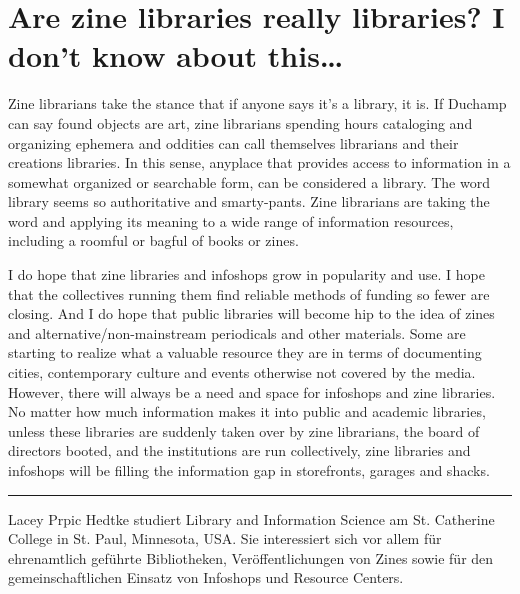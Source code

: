 \documentclass[output=paper]{langscibook}
\begin{document}
\hypertarget{are-zine-libraries-really-libraries-i-dont-know-about-this}{%
\section{Are zine libraries really libraries? I don't know about
this\ldots{}}\label{are-zine-libraries-really-libraries-i-dont-know-about-this}}

Zine librarians take the stance that if anyone says it's a library, it
is. If Duchamp can say found objects are art, zine librarians spending
hours cataloging and organizing ephemera and oddities can call
themselves librarians and their creations libraries. In this sense,
anyplace that provides access to information in a somewhat organized or
searchable form, can be considered a library. The word library seems so
authoritative and smarty-pants. Zine librarians are taking the word and
applying its meaning to a wide range of information resources, including
a roomful or bagful of books or zines.

I do hope that zine libraries and infoshops grow in popularity and use.
I hope that the collectives running them find reliable methods of
funding so fewer are closing. And I do hope that public libraries will
become hip to the idea of zines and alternative/non-mainstream
periodicals and other materials. Some are starting to realize what a
valuable resource they are in terms of documenting cities, contemporary
culture and events otherwise not covered by the media. However, there
will always be a need and space for infoshops and zine libraries. No
matter how much information makes it into public and academic libraries,
unless these libraries are suddenly taken over by zine librarians, the
board of directors booted, and the institutions are run collectively,
zine libraries and infoshops will be filling the information gap in
storefronts, garages and shacks.

\begin{center}\rule{0.5\linewidth}{0.5pt}\end{center}

Lacey Prpic Hedtke studiert Library and Information Science am St. Catherine College in St. Paul, Minnesota, USA. Sie interessiert sich vor allem für ehrenamtlich geführte Bibliotheken, Veröffentlichungen von Zines sowie für den gemeinschaftlichen Einsatz von Infoshops und Resource Centers.
\end{document}
